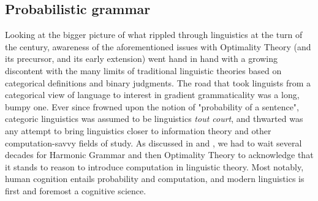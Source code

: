 \subsection{Probabilistic grammar}  %
Looking at the bigger picture of what rippled through linguistics at the turn of the century, awareness of the aforementioned issues with Optimality Theory (and its precursor, and its early extension) went hand in hand with a growing discontent with the many limits of traditional linguistic theories based on categorical definitions and binary judgments. The road that took linguists from a categorical view of language to interest in gradient grammaticality was a long, bumpy one. Ever since \textcite{chomsky1957syntactic} frowned upon the notion of "probability of a sentence", categoric linguistics was assumed to be linguistics \textit{tout court}, and thwarted was any attempt to bring linguistics closer to information theory and other computation-savvy fields of study. As discussed in  and , we had to wait several decades for Harmonic Grammar and then Optimality Theory to acknowledge that it stands to reason to introduce computation in linguistic theory. Most notably, human cognition entails probability and computation, and modern linguistics is first and foremost a cognitive science.\\
